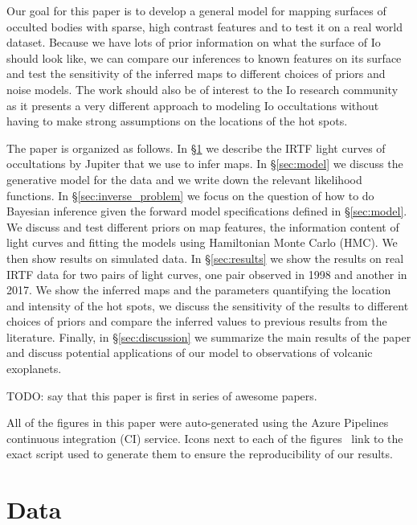 \documentclass[modern]{aastex62}
\begin{document}
Our goal for this paper is to develop a general model for mapping surfaces of occulted bodies with sparse, high contrast features and to test it on a real world dataset. 
Because we have lots of prior information on what the surface of Io should look like, we can compare our inferences to known features on its surface and test the sensitivity of the inferred maps to different choices of priors and noise models.
The work should also be of interest to the Io research community as it presents a very different approach to modeling Io occultations without having to make strong assumptions on the locations of the hot spots. 

The paper is organized as follows.
In \S\ref{sec:data} we describe the IRTF light curves of occultations by Jupiter that we use to infer maps.
In \S\ref{sec:model} we discuss the generative model for the data and we write down the relevant likelihood functions.
In \S\ref{sec:inverse_problem} we focus on the question of how to do Bayesian inference given the forward model specifications defined in \S\ref{sec:model}.
We discuss and test different priors on map features, the information content of light curves and fitting the models using Hamiltonian Monte Carlo (HMC). 
We then show results on simulated data.
In \S\ref{sec:results} we show the results on real IRTF data for two pairs of light curves, one pair observed in 1998 and another in 2017.
We show the inferred maps and the parameters quantifying the location and intensity of the hot spots, we discuss the sensitivity of the results to different choices of priors and compare the inferred values to previous results from the literature.
Finally, in \S\ref{sec:discussion} we summarize the main results of the paper and discuss potential applications of our model to observations of volcanic exoplanets.

TODO: say that this paper is first in series of awesome papers.

\vspace{1em}

All of the figures in this paper were auto-generated
using the Azure Pipelines continuous integration (CI) service.
Icons next to each of the figures \codeicon \,
link to the exact script used to generate them to ensure the reproducibility
of our results. 

\section{Data}
\label{sec:data}
\end{document}
